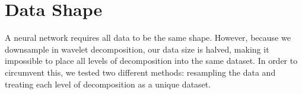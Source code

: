 \documentclass{turabian-thesis}
\begin{document}






















\section{Data Shape}

A neural network requires all data to be the same shape. However, because we downsample in wavelet decomposition, our data size is halved, making it impossible to place all levels of decomposition into the same dataset. In order to circumvent this, we tested two different methods: resampling the data and treating each level of decomposition as a unique dataset.
\end{document}
